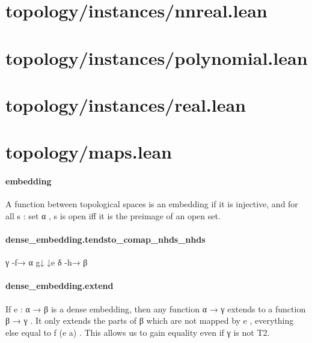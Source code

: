 \documentclass{article}
\begin{document}
\section{topology/instances/nnreal.lean}\section{topology/instances/polynomial.lean}\section{topology/instances/real.lean}\section{topology/maps.lean}\paragraph{embedding}
\par
A function between topological spaces is an embedding if it is injective,
and for all 
\colorbox[RGB]{253,246,227}{{{{\color[RGB]{101, 123, 131} s : set α }}}}, 
\colorbox[RGB]{253,246,227}{{{{\color[RGB]{101, 123, 131} s }}}} is open iff it is the preimage of an open set.
\paragraph{dense\_embedding.tendsto\_comap\_nhds\_nhds}
\par
γ -f→ α
g↓     ↓e
δ -h→ β
\paragraph{dense\_embedding.extend}
\par
If 
\colorbox[RGB]{253,246,227}{{{{\color[RGB]{101, 123, 131} e : α  }}}{{{\color[RGB]{133, 153, 0} → }}}{{{\color[RGB]{101, 123, 131}  β }}}} is a dense embedding, then any function 
\colorbox[RGB]{253,246,227}{{{{\color[RGB]{101, 123, 131} α  }}}{{{\color[RGB]{133, 153, 0} → }}}{{{\color[RGB]{101, 123, 131}  γ }}}} extends to a function 
\colorbox[RGB]{253,246,227}{{{{\color[RGB]{101, 123, 131} β  }}}{{{\color[RGB]{133, 153, 0} → }}}{{{\color[RGB]{101, 123, 131}  γ }}}}.
It only extends the parts of 
\colorbox[RGB]{253,246,227}{{{{\color[RGB]{101, 123, 131} β }}}} which are not mapped by 
\colorbox[RGB]{253,246,227}{{{{\color[RGB]{101, 123, 131} e }}}}, everything else equal to 
\colorbox[RGB]{253,246,227}{{{{\color[RGB]{101, 123, 131} f (e a) }}}}.
This allows us to gain equality even if 
\colorbox[RGB]{253,246,227}{{{{\color[RGB]{101, 123, 131} γ }}}} is not T2.
\end{document}
